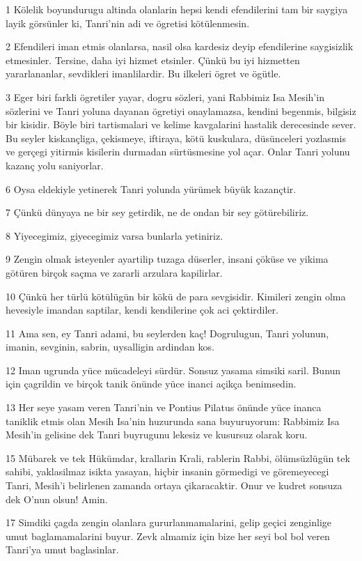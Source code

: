 \par 1 Kölelik boyundurugu altinda olanlarin hepsi kendi efendilerini tam bir saygiya layik görsünler ki, Tanri'nin adi ve ögretisi kötülenmesin.
\par 2 Efendileri iman etmis olanlarsa, nasil olsa kardesiz deyip efendilerine saygisizlik etmesinler. Tersine, daha iyi hizmet etsinler. Çünkü bu iyi hizmetten yararlananlar, sevdikleri imanlilardir. Bu ilkeleri ögret ve ögütle.
\par 3 Eger biri farkli ögretiler yayar, dogru sözleri, yani Rabbimiz Isa Mesih'in sözlerini ve Tanri yoluna dayanan ögretiyi onaylamazsa, kendini begenmis, bilgisiz bir kisidir. Böyle biri tartismalari ve kelime kavgalarini hastalik derecesinde sever. Bu seyler kiskançliga, çekismeye, iftiraya, kötü kuskulara, düsünceleri yozlasmis ve gerçegi yitirmis kisilerin durmadan sürtüsmesine yol açar. Onlar Tanri yolunu kazanç yolu saniyorlar.
\par 6 Oysa eldekiyle yetinerek Tanri yolunda yürümek büyük kazançtir.
\par 7 Çünkü dünyaya ne bir sey getirdik, ne de ondan bir sey götürebiliriz.
\par 8 Yiyecegimiz, giyecegimiz varsa bunlarla yetiniriz.
\par 9 Zengin olmak isteyenler ayartilip tuzaga düserler, insani çöküse ve yikima götüren birçok saçma ve zararli arzulara kapilirlar.
\par 10 Çünkü her türlü kötülügün bir kökü de para sevgisidir. Kimileri zengin olma hevesiyle imandan saptilar, kendi kendilerine çok aci çektirdiler.
\par 11 Ama sen, ey Tanri adami, bu seylerden kaç! Dogrulugun, Tanri yolunun, imanin, sevginin, sabrin, uysalligin ardindan kos.
\par 12 Iman ugrunda yüce mücadeleyi sürdür. Sonsuz yasama simsiki saril. Bunun için çagrildin ve birçok tanik önünde yüce inanci açikça benimsedin.
\par 13 Her seye yasam veren Tanri'nin ve Pontius Pilatus önünde yüce inanca taniklik etmis olan Mesih Isa'nin huzurunda sana buyuruyorum: Rabbimiz Isa Mesih'in gelisine dek Tanri buyrugunu lekesiz ve kusursuz olarak koru.
\par 15 Mübarek ve tek Hükümdar, krallarin Krali, rablerin Rabbi, ölümsüzlügün tek sahibi, yaklasilmaz isikta yasayan, hiçbir insanin görmedigi ve göremeyecegi Tanri, Mesih'i belirlenen zamanda ortaya çikaracaktir. Onur ve kudret sonsuza dek O'nun olsun! Amin.
\par 17 Simdiki çagda zengin olanlara gururlanmamalarini, gelip geçici zenginlige umut baglamamalarini buyur. Zevk almamiz için bize her seyi bol bol veren Tanri'ya umut baglasinlar.
